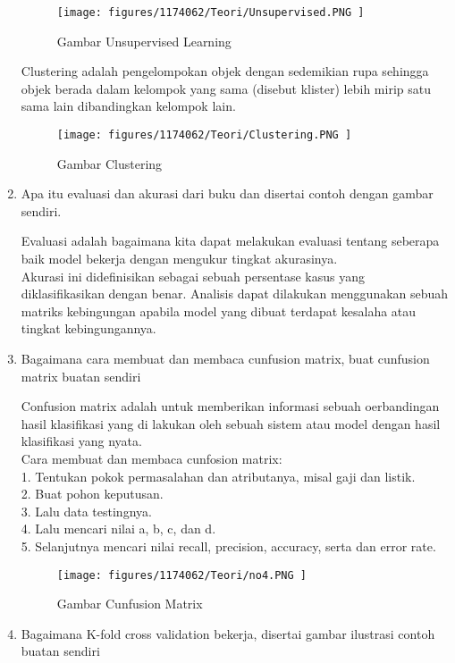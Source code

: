 \begin{enumerate}
\begin{figure}[H]
	\texttt{[image: figures/1174062/Teori/Unsupervised.PNG ]}
	\centering
	\caption{Gambar Unsupervised Learning }
\end{figure}

Clustering adalah pengelompokan objek dengan sedemikian rupa sehingga objek berada dalam kelompok yang sama (disebut klister) lebih mirip satu sama lain dibandingkan kelompok lain. 

\begin{figure}[H]
	\texttt{[image: figures/1174062/Teori/Clustering.PNG ]}
	\centering
	\caption{Gambar Clustering }
\end{figure}

\item Apa itu evaluasi dan akurasi dari buku dan disertai contoh dengan gambar sendiri.

Evaluasi adalah bagaimana kita dapat melakukan evaluasi tentang seberapa baik model bekerja dengan mengukur tingkat akurasinya.\\
 
Akurasi ini didefinisikan sebagai sebuah persentase kasus yang diklasifikasikan dengan benar. Analisis dapat dilakukan menggunakan sebuah matriks kebingungan apabila model yang dibuat terdapat kesalaha atau tingkat kebingungannya.

\item Bagaimana cara membuat dan membaca cunfusion matrix, buat cunfusion matrix buatan sendiri

Confusion matrix adalah untuk memberikan informasi sebuah oerbandingan hasil klasifikasi yang di lakukan oleh sebuah sistem atau model dengan hasil klasifikasi yang nyata.\\
Cara membuat dan membaca cunfosion matrix:\\
1. Tentukan pokok permasalahan dan atributanya, misal gaji dan listik.\\
2. Buat pohon keputusan.\\
3. Lalu data testingnya.\\
4. Lalu mencari nilai a, b, c, dan d.\\
5. Selanjutnya mencari nilai recall, precision, accuracy, serta dan error rate.

\begin{figure}[H]
	\texttt{[image: figures/1174062/Teori/no4.PNG ]}
	\centering
	\caption{Gambar Cunfusion Matrix }
\end{figure}

\item Bagaimana K-fold cross validation bekerja, disertai gambar ilustrasi contoh buatan sendiri


\end{enumerate}
